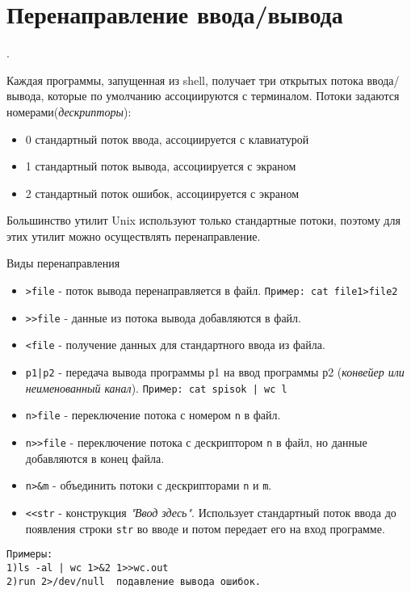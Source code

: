 \section{Перенаправление ввода/вывода}.

\label{redirect}Каждая программы, запущенная из shell, получает три открытых потока ввода/вывода, которые по умолчанию ассоциируются с терминалом. Потоки задаются номерами(\emph{дескрипторы}):
\begin{itemize}
\item 0 стандартный поток ввода, ассоциируется с клавиатурой
\item 1 стандартный поток вывода, ассоциируется с экраном
\item 2 стандартный поток ошибок, ассоциируется с экраном
\end{itemize}

Большинство утилит Unix используют только стандартные потоки, поэтому для этих утилит можно осуществлять перенаправление.
\begin{center}
Виды перенаправления
\end{center}
\begin{itemize}
	\item \verb+>file+ - поток вывода перенаправляется в файл. \verb+Пример: cat file1>file2+
	\item \verb+>>file+ - данные из потока вывода добавляются в файл.
	\item \verb+<file+ -  получение данных для стандартного ввода из файла.
	\item \verb+p1|p2+ - передача вывода программы р1 на ввод программы р2 (\emph{конвейер или неименованный канал}). \verb+Пример: cat spisok | wc l+
	\item \verb+n>file+ - переключение потока с номером \verb+n+ в файл.
	\item \verb+n>>file+ - переключение потока с дескриптором \verb+n+ в файл, но данные добавляются в конец файла.
	\item \verb+n>&m+  - объединить потоки с дескрипторами \verb+n+ и \verb=m=. 
	\item \verb+<<str+ - конструкция \emph{"Ввод здесь"}. Использует стандартный поток ввода до появления строки \verb+str+ во вводе и потом передает его на вход программе.
\end{itemize}
\begin{verbatim}
Примеры: 
1)ls -al | wc 1>&2 1>>wc.out
2)run 2>/dev/null  подавление вывода ошибок.
\end{verbatim}


